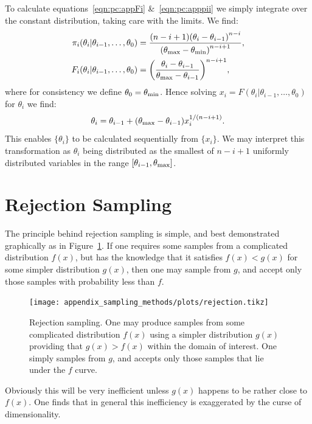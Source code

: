 To calculate equations~\eqref{eqn:pc:appFi} \&~\ref{eqn:pc:apppii} we simply integrate over the constant distribution, taking care with the limits. We find:
\begin{align}
  \pi_i(\theta_i|\theta_{i-1},\ldots,\theta_0) &= \frac{(n-i+1){(\theta_i-\theta_{i-1})}^{n-i}}{{(\theta_{\mathrm{max}}-\theta_{\mathrm{min}})}^{n-i+1}},\\
  F_i(\theta_i|\theta_{i-1},\ldots,\theta_0) &= {\left(\frac{\theta_i-\theta_{i-1}}{\theta_{\mathrm{max}}-\theta_{i-1}}\right)}^{n-i+1},
  \label{eqn:pc:sorted_uniform_calc}
\end{align}
where for consistency we define $\theta_0 = \theta_{\mathrm{min}}$. Hence solving $x_i=F(\theta_i|\theta_{i-1},\ldots,\theta_0)$ for $\theta_i$ we find:
\begin{equation}
  \theta_i = \theta_{i-1}+ (\theta_{\mathrm{max}}-\theta_{i-1})x_i^{1/(n-i+1)}.
  \label{eqn:pc:sorted_uniform_trans}
\end{equation}
This enables $\{\theta_i\}$ to be calculated sequentially from $\{x_i\}$. We may interpret this transformation as $\theta_i$ being distributed as the smallest of $n-i+1$ uniformly distributed variables in the range $[\theta_{i-1},\theta_{\mathrm{max}}]$.



\section{Rejection Sampling}
\label{sec:sm:rejection}

The principle behind rejection sampling is simple, and best demonstrated graphically as in Figure~\ref{fig:sm:rej}. If one requires some samples from a complicated distribution $f(x)$, but has the knowledge that it satisfies $f(x)<g(x)$ for some simpler distribution $g(x)$, then one may sample from $g$, and accept only those samples with probability less than $f$. 

\begin{figure}[ht]
  \centering
  \texttt{[image: appendix\_sampling\_methods/plots/rejection.tikz]}
  \caption{Rejection sampling. One may produce samples from some complicated distribution $f(x)$ using a simpler distribution $g(x)$ providing that $g(x)>f(x)$ within the domain of interest. One simply samples from $g$, and accepts only those samples that lie under the $f$ curve.\label{fig:sm:rej}}
\end{figure}

Obviously this will be very inefficient unless $g(x)$ happens to be rather close to $f(x)$. One finds that in general this inefficiency is exaggerated by the curse of dimensionality.

